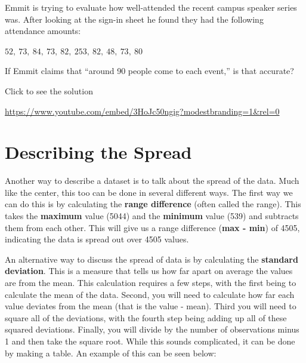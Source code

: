 \documentclass[
  letterpaper,
  DIV=11,
  numbers=noendperiod]{scrreprt}
\begin{document}
\begin{tcolorbox}[enhanced jigsaw, colbacktitle=quarto-callout-tip-color!10!white, breakable, bottomrule=.15mm, colframe=quarto-callout-tip-color-frame, left=2mm, opacitybacktitle=0.6, title=\textcolor{quarto-callout-tip-color}{\faLightbulb}\hspace{0.5em}{Try it Out}, leftrule=.75mm, opacityback=0, rightrule=.15mm, titlerule=0mm, bottomtitle=1mm, colback=white, toprule=.15mm, arc=.35mm, toptitle=1mm, coltitle=black]

Emmit is trying to evaluate how well-attended the recent campus speaker
series was. After looking at the sign-in sheet he found they had the
following attendance amounts:

\(52,\ 73,\ 84,\ 73,\ 82,\ 253,\ 82,\ 48,\ 73,\ 80\)

If Emmit claims that ``around 90 people come to each event,'' is that
accurate?

Click to see the solution

\url{https://www.youtube.com/embed/3HoJc50ngig?modestbranding=1&rel=0}

\end{tcolorbox}

\section{Describing the Spread}\label{describing-the-spread}

Another way to describe a dataset is to talk about the spread of the
data. Much like the center, this too can be done in several different
ways. The first way we can do this is by calculating the \textbf{range
difference} (often called the range). This takes the \textbf{maximum}
value (5044) and the \textbf{minimum} value (539) and subtracts them
from each other. This will give us a range difference (\textbf{max -
min}) of 4505, indicating the data is spread out over 4505 values.

An alternative way to discuss the spread of data is by calculating the
\textbf{standard deviation}. This is a measure that tells us how far
apart on average the values are from the mean. This calculation requires
a few steps, with the first being to calculate the mean of the data.
Second, you will need to calculate how far each value deviates from the
mean (that is the value - mean). Third you will need to square all of
the deviations, with the fourth step being adding up all of these
squared deviations. Finally, you will divide by the number of
observations minus 1 and then take the square root. While this sounds
complicated, it can be done by making a table. An example of this can be
seen below:
\end{document}
